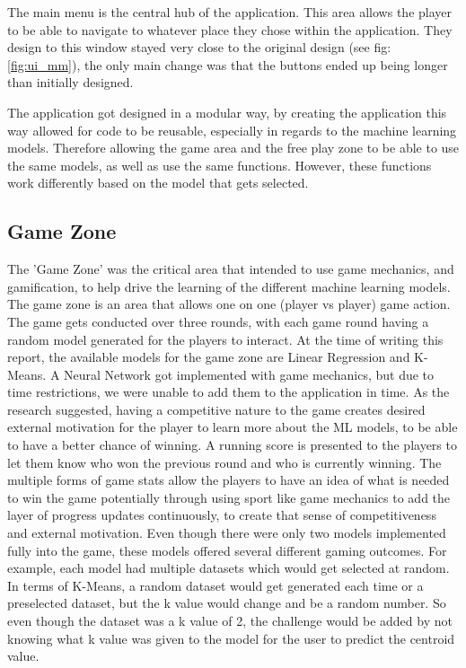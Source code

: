 	The main menu is the central hub of the application. This area allows the player to be able to navigate to whatever place they chose within the application. They design to this window stayed very close to the original design (see fig: \ref{fig:ui_mm}), the only main change was that the buttons ended up being longer than initially designed.
	
	The application got designed in a modular way, by creating the application this way allowed for code to be reusable, especially in regards to the machine learning models. Therefore allowing the game area and the free play zone to be able to use the same models, as well as use the same functions. However, these functions work differently based on the model that gets selected. 
	
		
	\subsection{Game Zone}
	
		The 'Game Zone' was the critical area that intended to use game mechanics, and gamification, to help drive the learning of the different machine learning models. The game zone is an area that allows one on one (player vs player) game action. The game gets conducted over three rounds, with each game round having a random model generated for the players to interact. At the time of writing this report, the available models for the game zone are Linear Regression and K-Means. A Neural Network got implemented with game mechanics, but due to time restrictions, we were unable to add them to the application in time. As the research suggested, having a competitive nature to the game creates desired external motivation for the player to learn more about the ML models, to be able to have a better chance of winning. A running score is presented to the players to let them know who won the previous round and who is currently winning. The multiple forms of game stats allow the players to have an idea of what is needed to win the game potentially through using sport like game mechanics to add the layer of progress updates continuously, to create that sense of competitiveness and external motivation. Even though there were only two models implemented fully into the game, these models offered several different gaming outcomes. For example, each model had multiple datasets which would get selected at random. In terms of K-Means, a random dataset would get generated each time or a preselected dataset, but the k value would change and be a random number. So even though the dataset was a k value of 2, the challenge would be added by not knowing what k value was given to the model for the user to predict the centroid value. 
		
